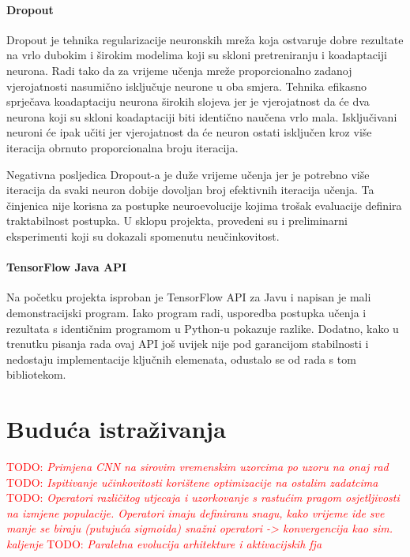 \documentclass[times, utf8, numeric, diplomski]{fer}
\def\TODO#1{\noindent\textcolor{red}{TODO: \textit{#1}}\newline}
\def\todo#1{\TODO{#1}}
\begin{document}
\subsubsection{Dropout}
Dropout \citep{dropout} je tehnika regularizacije neuronskih mreža koja ostvaruje dobre rezultate na vrlo dubokim i širokim modelima koji su skloni pretreniranju i koadaptaciji neurona. Radi tako da za vrijeme učenja mreže proporcionalno zadanoj vjerojatnosti nasumično isključuje neurone u oba smjera. Tehnika efikasno sprječava koadaptaciju neurona širokih slojeva jer je vjerojatnost da će dva neurona koji su skloni koadaptaciji biti identično naučena vrlo mala. Isključivani neuroni će ipak učiti jer vjerojatnost da će neuron ostati isključen kroz više iteracija obrnuto proporcionalna broju iteracija.

Negativna posljedica Dropout-a je duže vrijeme učenja jer je potrebno više iteracija da svaki neuron dobije dovoljan broj efektivnih iteracija učenja. Ta činjenica nije korisna za postupke neuroevolucije kojima trošak evaluacije definira traktabilnost postupka. U sklopu projekta, provedeni su i preliminarni eksperimenti koji su dokazali spomenutu neučinkovitost.

\subsubsection{TensorFlow Java API}
Na početku projekta isproban je TensorFlow API za Javu i napisan je mali demonstracijski program. Iako program radi, usporedba postupka učenja i rezultata s identičnim programom u Python-u pokazuje razlike. Dodatno, kako u trenutku pisanja rada ovaj API još uvijek nije pod garancijom stabilnosti i nedostaju implementacije ključnih elemenata, odustalo se od rada s tom bibliotekom.

\chapter{Buduća istraživanja}
\todo{Primjena CNN na sirovim vremenskim uzorcima po uzoru na onaj rad}
\todo{Ispitivanje učinkovitosti korištene optimizacije na ostalim zadatcima}
\todo{Operatori različitog utjecaja i uzorkovanje s rastućim pragom osjetljivosti na izmjene populacije. Operatori imaju definiranu snagu, kako vrijeme ide sve manje se biraju (putujuća sigmoida) snažni operatori -> konvergencija kao sim. kaljenje}
\todo{Paralelna evolucija arhitekture i aktivacijskih fja \citep{cnn_evolution}}
\end{document}
